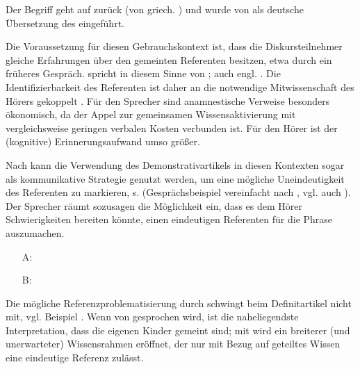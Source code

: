 \begin{exe}
	\ex \label{ex:anamn}   
\end{exe}

Der Begriff  geht auf \textcite{Buhler1934} zurück (von griech.  ) und wurde von \textcite{Himmelmann1997} als deutsche Übersetzung des  \parencite{Himmelmann1996,Diessel1999}  eingeführt.

Die Voraussetzung für diesen Gebrauchskontext ist, dass die Diskursteilnehmer gleiche Erfahrungen über den gemeinten Referenten besitzen, etwa durch ein früheres Gespräch. \textcite[44]{Bisle-Muller1991} spricht in diesem Sinne von ; auch engl.  \parencite[106]{Diessel1999}. Die Identifizierbarkeit des Referenten ist daher an die notwendige Mitwissenschaft des Hörers gekoppelt \parencite[72]{Szczepaniak2011a}. Für  den Sprecher sind anamnestische Verweise besonders ökonomisch, da der Appel zur gemeinsamen Wissensaktivierung mit vergleichsweise geringen verbalen Kosten verbunden ist. Für den Hörer ist der (kognitive) Erinnerungsaufwand umso größer.

Nach \textcite[79f.]{Bisle-Muller1991} kann die Verwendung des Demonstrativartikels in diesen Kontexten sogar als kommunikative Strategie genutzt werden, um eine mögliche Uneindeutigkeit des Referenten zu markieren, s.  (Gesprächsbeispiel vereinfacht nach \cite[637]{Auer1984}, vgl. auch \cite[58]{Himmelmann1997}). Der Sprecher räumt sozusagen die Möglichkeit ein, dass es dem Hörer Schwierigkeiten bereiten könnte, einen eindeutigen Referenten für die Phrase  auszumachen. 

\begin{exe}
	\ex \label{ex:auer} 
	\begin{itemize}
		\item[A:]  
		\item[B:]  
	\end{itemize}
\end{exe}

Die mögliche Referenzproblematisierung durch  schwingt beim Definitartikel nicht mit, vgl. Beispiel  \parencites()()[][80]{Bisle-Muller1991}[][70]{Himmelmann1997}. Wenn von  gesprochen wird, ist die naheliegendste Interpretation, dass die eigenen Kinder gemeint sind; mit  wird ein breiterer (und unerwarteter) Wissensrahmen eröffnet, der nur mit Bezug auf geteiltes Wissen eine eindeutige Referenz zulässt.    

